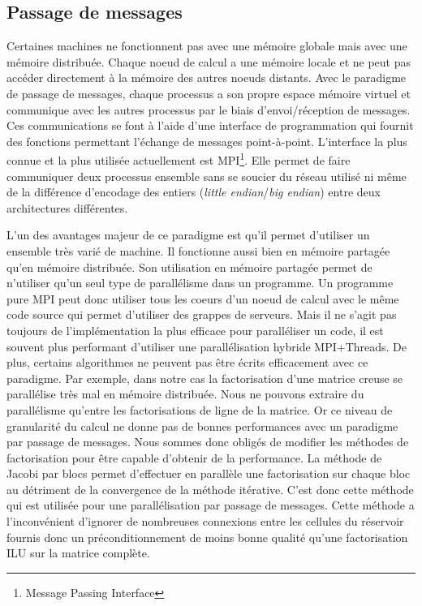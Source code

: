 \subsection{Passage de messages}
Certaines machines ne fonctionnent pas avec une mémoire globale mais avec une mémoire distribuée.
% 
Chaque noeud de calcul a une mémoire locale et ne peut pas accéder directement à la mémoire des autres noeuds distants.
%
Avec le paradigme de passage de messages, chaque processus a son propre espace mémoire virtuel et communique avec les autres processus par le biais d'envoi/réception de messages.
%
Ces communications se font à l'aide d'une interface de programmation qui fournit des fonctions permettant l'échange de messages point-à-point.
%
L'interface la plus connue et la plus utilisée actuellement est MPI\footnote{Message Passing Interface}.
%
Elle permet de faire communiquer deux processus ensemble sans se soucier du réseau utilisé ni même de la différence d'encodage des entiers ({\em little endian}/{\em big endian}) entre deux architectures différentes.


L'un des avantages majeur de ce paradigme est qu'il permet d'utiliser un ensemble très varié de machine.
%
Il fonctionne aussi bien en mémoire partagée qu'en mémoire distribuée.
%
Son utilisation en mémoire partagée permet de n'utiliser qu'un seul type de parallélisme dans un programme.
%
Un programme pure MPI peut donc utiliser tous les coeurs d'un noeud de calcul avec le même code source qui permet d'utiliser des grappes de serveurs.
%
Mais il ne s'agit pas toujours de l'implémentation la plus efficace pour paralléliser un code, il est souvent plus performant d'utiliser une parallélisation hybride MPI+Threads\cite{mpi_openmp}.
%
De plus, certains algorithmes ne peuvent pas être écrits efficacement avec ce paradigme.
%
Par exemple, dans notre cas la factorisation d'une matrice creuse se parallélise très mal en mémoire distribuée.
%
Nous ne pouvons extraire du parallélisme qu'entre les factorisations de ligne de la matrice.
%
Or ce niveau de granularité du calcul ne donne pas de bonnes performances avec un paradigme par passage de messages.
%
Nous sommes donc obligés de modifier les méthodes de factorisation pour être capable d'obtenir de la performance.
%
La méthode de Jacobi par blocs permet d'effectuer en parallèle une factorisation sur chaque bloc au détriment de la convergence de la méthode itérative.
%
C'est donc cette méthode qui est utilisée pour une parallélisation par passage de messages.
%
Cette méthode a l'inconvénient d'ignorer de nombreuses connexions entre les cellules du réservoir fournis donc un préconditionnement de moins bonne qualité qu'une factorisation ILU sur la matrice complète.
